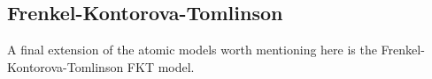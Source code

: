 












\subsection{Frenkel-Kontorova-Tomlinson}
A final extension of the atomic models worth mentioning here is the Frenkel-Kontorova-Tomlinson \acrshort{FKT} model. 


